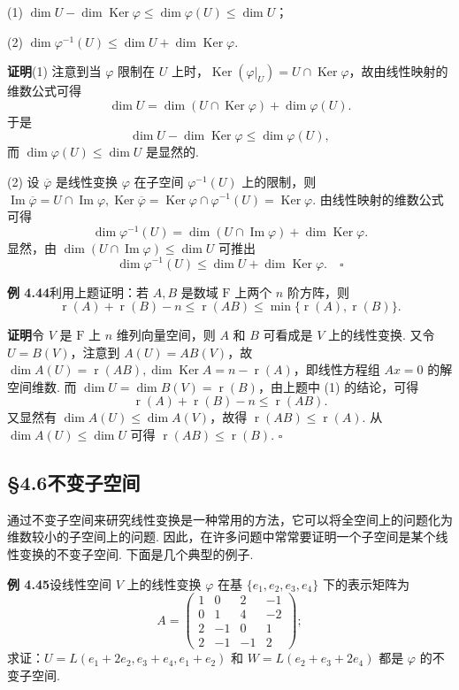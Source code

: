 \documentclass[UTF8,12pt,a4paper,fontset=fandol]{ctexart}
\begin{document}
(1) $\dim U-\dim\operatorname{Ker}\varphi\le\dim\varphi(U)\le\dim U$；

(2) $\dim\varphi^{-1}(U)\le\dim U+\dim\operatorname{Ker}\varphi$.

\noindent\textbf{证明}\quad (1) 注意到当 $\varphi$ 限制在 $U$ 上时，$\operatorname{Ker}(\varphi|_U)=U\cap\operatorname{Ker}\varphi$，故由线性映射的维数公式可得
\[
\dim U=\dim(U\cap\operatorname{Ker}\varphi)+\dim\varphi(U).
\]
于是
\[
\dim U-\dim\operatorname{Ker}\varphi\le\dim\varphi(U),
\]
而 $\dim\varphi(U)\le\dim U$ 是显然的.

(2) 设 $\overline{\varphi}$ 是线性变换 $\varphi$ 在子空间 $\varphi^{-1}(U)$ 上的限制，则 $\operatorname{Im}\overline{\varphi}=U\cap\operatorname{Im}\varphi,\operatorname{Ker}\overline{\varphi}=\operatorname{Ker}\varphi\cap\varphi^{-1}(U)=\operatorname{Ker}\varphi$. 由线性映射的维数公式可得
\[
\dim\varphi^{-1}(U)=\dim(U\cap\operatorname{Im}\varphi)+\dim\operatorname{Ker}\varphi.
\]
显然，由 $\dim(U\cap\operatorname{Im}\varphi)\le\dim U$ 可推出
\[
\dim\varphi^{-1}(U)\le\dim U+\dim\operatorname{Ker}\varphi. \quad \square
\]

\noindent\textbf{例 4.44}\quad 利用上题证明：若 $A,B$ 是数域 $\mathrm{F}$ 上两个 $n$ 阶方阵，则
\[
\operatorname{r}(A)+\operatorname{r}(B)-n\le\operatorname{r}(AB)\le \min\{\operatorname{r}(A),\operatorname{r}(B)\}.
\]

\noindent\textbf{证明}\quad 令 $V$ 是 $\mathrm{F}$ 上 $n$ 维列向量空间，则 $A$ 和 $B$ 可看成是 $V$ 上的线性变换. 又令 $U=B(V)$，注意到 $A(U)=AB(V)$，故 $\dim A(U)=\operatorname{r}(AB),\dim\operatorname{Ker}A=n-\operatorname{r}(A)$，即线性方程组 $Ax=0$ 的解空间维数. 而 $\dim U=\dim B(V)=\operatorname{r}(B)$，由上题中 (1) 的结论，可得
\[
\operatorname{r}(A)+\operatorname{r}(B)-n\le\operatorname{r}(AB).
\]
又显然有 $\dim A(U)\le\dim A(V)$，故得 $\operatorname{r}(AB)\le\operatorname{r}(A)$. 从 $\dim A(U)\le\dim U$ 可得 $\operatorname{r}(AB)\le\operatorname{r}(B)$. $\square$

\subsection*{§4.6\quad 不变子空间}

通过不变子空间来研究线性变换是一种常用的方法，它可以将全空间上的问题化为维数较小的子空间上的问题. 因此，在许多问题中常常要证明一个子空间是某个线性变换的不变子空间. 下面是几个典型的例子.

\noindent\textbf{例 4.45}\quad 设线性空间 $V$ 上的线性变换 $\varphi$ 在基 $\{e_1,e_2,e_3,e_4\}$ 下的表示矩阵为
\[
A=\left(\begin{array}{rrrr}
1 & 0 & 2 & -1\\
0 & 1 & 4 & -2\\
2 & -1 & 0 & 1\\
2 & -1 & -1 & 2
\end{array}\right);
\]
求证：$U=L(e_1+2e_2,e_3+e_4,e_1+e_2)$ 和 $W=L(e_2+e_3+2e_4)$ 都是 $\varphi$ 的不变子空间.
\end{document}
